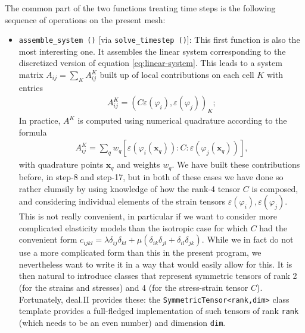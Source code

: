 \documentclass{article}
\renewcommand{\vec}[1]{\mathbf{#1}}
\begin{document}
The common part of the two functions treating time steps is the following
sequence of operations on the present mesh:
\begin{itemize}
\item \texttt{assemble\_system ()} [via \texttt{solve\_timestep ()}]:
  This first function is also the most interesting one. It assembles the
  linear system corresponding to the discretized version of equation
  \eqref{eq:linear-system}. This leads to a system matrix $A_{ij} = \sum_K
  A^K_{ij}$ built up of local contributions on each cell $K$ with entries
  \begin{gather}
    A^K_{ij} = (C \varepsilon(\varphi_i), \varepsilon(\varphi_j))_K;
  \end{gather}
  In practice, $A^K$ is computed using numerical quadrature according to the
  formula
  \begin{gather}
    A^K_{ij} = \sum_q w_q [\varepsilon(\varphi_i(\vec x_q)) : C :
                           \varepsilon(\varphi_j(\vec x_q))],
  \end{gather}
  with quadrature points $\vec x_q$ and weights $w_q$. We have built these
  contributions before, in step-8 and step-17, but in both of these cases we
  have done so rather clumsily by using knowledge of how the rank-4 tensor $C$
  is composed, and considering individual elements of the strain tensors
  $\varepsilon(\varphi_i),\varepsilon(\varphi_j)$. This is not really
  convenient, in particular if we want to consider more complicated elasticity
  models than the isotropic case for which $C$ had the convenient form
  $c_{ijkl}  = \lambda \delta_{ij} \delta_{kl} + \mu (\delta_{ik} \delta_{jl}
  + \delta_{il} \delta_{jk})$. While we in fact do not use a more complicated
  form than this in the present program, we nevertheless want to write it in a
  way that would easily allow for this. It is then natural to introduce
  classes that represent symmetric tensors of rank 2 (for the strains and
  stresses) and 4 (for the stress-strain tensor $C$). Fortunately, deal.II
  provides these: the \texttt{SymmetricTensor<rank,dim>} class template
  provides a full-fledged implementation of such tensors of rank \texttt{rank}
  (which needs to be an even number) and dimension \texttt{dim}.


\end{itemize}
\end{document}
